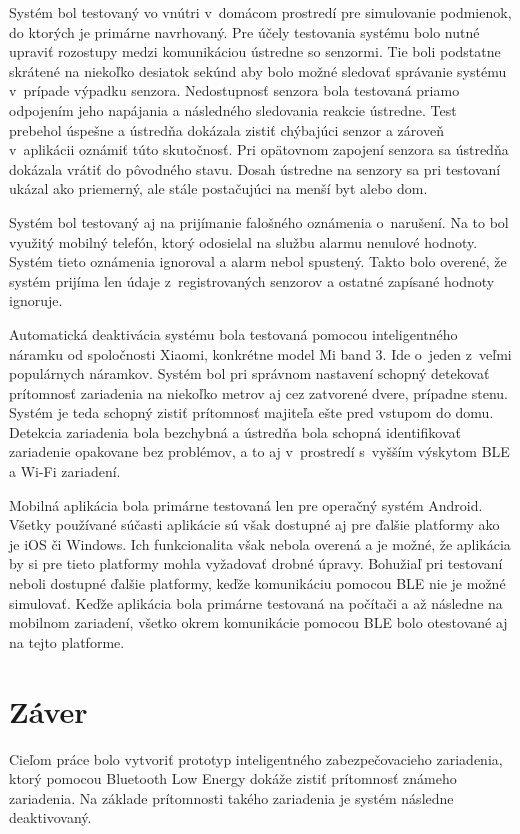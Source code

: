 Systém bol testovaný vo vnútri v~domácom prostredí pre simulovanie podmienok, do ktorých je primárne navrhovaný. Pre účely testovania systému bolo nutné upraviť rozostupy medzi komunikáciou ústredne so senzormi. Tie boli podstatne skrátené na niekoľko desiatok sekúnd aby bolo možné sledovať správanie systému v~prípade výpadku senzora. Nedostupnosť senzora bola testovaná priamo odpojením jeho napájania a následného sledovania reakcie ústredne. Test prebehol úspešne a ústredňa dokázala zistiť chýbajúci senzor a zároveň v~aplikácii oznámiť túto skutočnosť. Pri opätovnom zapojení senzora sa ústredňa dokázala vrátiť do pôvodného stavu. Dosah ústredne na senzory sa pri testovaní ukázal ako priemerný, ale stále postačujúci na menší byt alebo dom.

Systém bol testovaný aj na prijímanie falošného oznámenia o~narušení. Na to bol využitý mobilný telefón, ktorý odosielal na službu alarmu nenulové hodnoty. Systém tieto oznámenia ignoroval a alarm nebol spustený. Takto bolo overené, že systém prijíma len údaje z~registrovaných senzorov a ostatné zapísané hodnoty ignoruje.

Automatická deaktivácia systému bola testovaná pomocou inteligentného náramku od spoločnosti Xiaomi, konkrétne model Mi band 3. Ide o~jeden z~veľmi populárnych náramkov. Systém bol pri správnom nastavení schopný detekovať prítomnosť zariadenia na niekoľko metrov aj cez zatvorené dvere, prípadne stenu. Systém je teda schopný zistiť prítomnosť majiteľa ešte pred vstupom do domu. Detekcia zariadenia bola bezchybná a ústredňa bola schopná identifikovať zariadenie opakovane bez problémov, a to aj v~prostredí s~vyšším výskytom BLE a Wi-Fi zariadení. 

Mobilná aplikácia bola primárne testovaná len pre operačný systém Android. Všetky používané súčasti aplikácie sú však dostupné aj pre ďalšie platformy ako je iOS či Windows. Ich funkcionalita však nebola overená a je možné, že aplikácia by si pre tieto platformy mohla vyžadovať drobné úpravy. Bohužiaľ pri testovaní neboli dostupné ďalšie platformy, keďže komunikáciu pomocou BLE nie je možné simulovať. Keďže aplikácia bola primárne testovaná na počítači a až následne na mobilnom zariadení, všetko okrem komunikácie pomocou BLE bolo otestované aj na tejto platforme. 


\chapter{Záver}

Cieľom práce bolo vytvoriť prototyp inteligentného zabezpečovacieho zariadenia, ktorý pomocou Bluetooth Low Energy dokáže zistiť prítomnosť známeho zariadenia. Na základe prítomnosti takého zariadenia je systém následne deaktivovaný.

